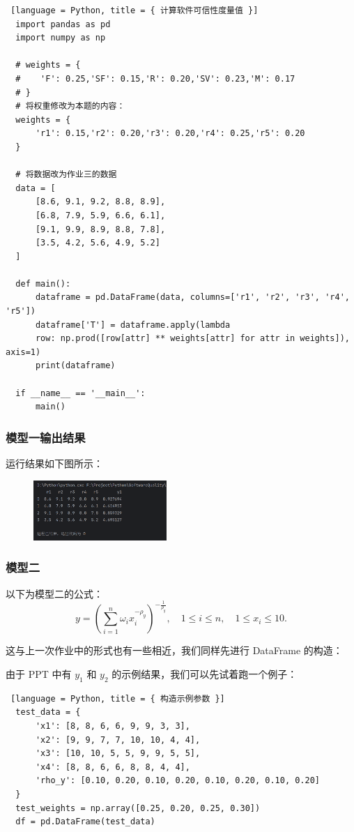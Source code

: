 \begin{lstlisting} [language = Python, title = { 计算软件可信性度量值 }]
  import pandas as pd
  import numpy as np
  
  # weights = {
  #    'F': 0.25,'SF': 0.15,'R': 0.20,'SV': 0.23,'M': 0.17
  # }
  # 将权重修改为本题的内容：
  weights = {
      'r1': 0.15,'r2': 0.20,'r3': 0.20,'r4': 0.25,'r5': 0.20
  }
  
  # 将数据改为作业三的数据
  data = [
      [8.6, 9.1, 9.2, 8.8, 8.9],
      [6.8, 7.9, 5.9, 6.6, 6.1],
      [9.1, 9.9, 8.9, 8.8, 7.8],
      [3.5, 4.2, 5.6, 4.9, 5.2]
  ]
  
  def main():
      dataframe = pd.DataFrame(data, columns=['r1', 'r2', 'r3', 'r4', 'r5'])
      dataframe['T'] = dataframe.apply(lambda
      row: np.prod([row[attr] ** weights[attr] for attr in weights]), axis=1)
      print(dataframe)
  
  if __name__ == '__main__':
      main()
\end{lstlisting}

\subsubsection{模型一输出结果}

运行结果如下图所示：

\begin{figure}[H]
  \centering
  \includegraphics[width=0.45\textwidth]{img6/result1.png}
\end{figure}

\subsubsection{模型二}

以下为模型二的公式：
\[
y = \left( \sum_{i=1}^{n} \omega_i x_i^{-\rho_y} \right)^{-\frac{1}{\rho_y}}, \quad 1 \leq i \leq n, \quad 1 \leq x_i \leq 10.
\]

这与上一次作业中的形式也有一些相近，我们同样先进行 DataFrame 的构造：

由于 PPT 中有 $y_1$ 和 $y_2$ 的示例结果，我们可以先试着跑一个例子：

\begin{lstlisting} [language = Python, title = { 构造示例参数 }]
  test_data = {
      'x1': [8, 8, 6, 6, 9, 9, 3, 3],
      'x2': [9, 9, 7, 7, 10, 10, 4, 4],
      'x3': [10, 10, 5, 5, 9, 9, 5, 5],
      'x4': [8, 8, 6, 6, 8, 8, 4, 4],
      'rho_y': [0.10, 0.20, 0.10, 0.20, 0.10, 0.20, 0.10, 0.20]
  }
  test_weights = np.array([0.25, 0.20, 0.25, 0.30])
  df = pd.DataFrame(test_data)
\end{lstlisting}

